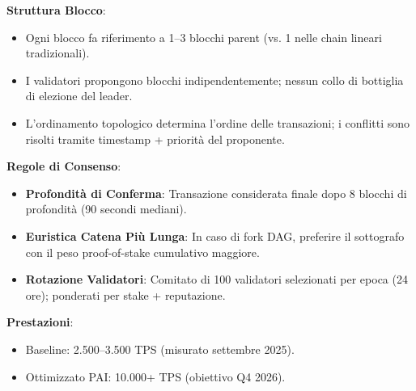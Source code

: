 \documentclass[11pt]{article}
\begin{document}
\textbf{Struttura Blocco}:
\begin{itemize}[noitemsep]
  \item Ogni blocco fa riferimento a 1--3 blocchi parent (vs. 1 nelle chain lineari tradizionali).
  \item I validatori propongono blocchi indipendentemente; nessun collo di bottiglia di elezione del leader.
  \item L'ordinamento topologico determina l'ordine delle transazioni; i conflitti sono risolti tramite timestamp + priorità del proponente.
\end{itemize}

\textbf{Regole di Consenso}:
\begin{itemize}[noitemsep]
  \item \textbf{Profondità di Conferma}: Transazione considerata finale dopo 8 blocchi di profondità (90 secondi mediani).
  \item \textbf{Euristica Catena Più Lunga}: In caso di fork DAG, preferire il sottografo con il peso proof-of-stake cumulativo maggiore.
  \item \textbf{Rotazione Validatori}: Comitato di 100 validatori selezionati per epoca (24 ore); ponderati per stake + reputazione.
\end{itemize}

\textbf{Prestazioni}:
\begin{itemize}[noitemsep]
  \item Baseline: 2.500--3.500 TPS (misurato settembre 2025).
  \item Ottimizzato PAI: 10.000+ TPS (obiettivo Q4 2026).
\end{itemize}
\end{document}

